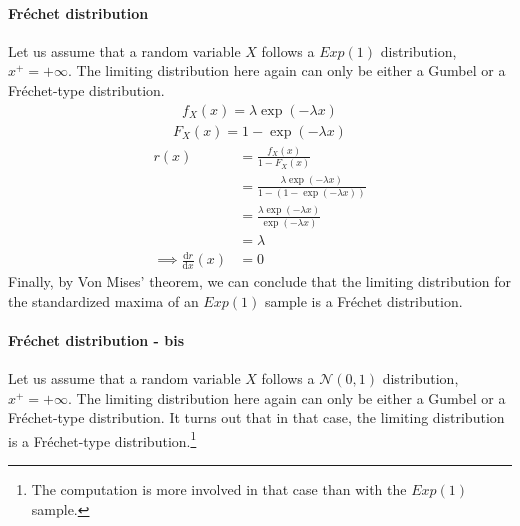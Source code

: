 \paragraph{Fréchet distribution}
Let us assume that a random variable $X$ follows a $Exp(1)$ distribution, $x^+ = + \infty$. The limiting distribution here again can only be either a Gumbel or a Fréchet-type distribution.
\begin{equation}
\begin{alignat*}{2}
f_X(x) = \lambda \exp(- \lambda x)
\end{alignat*}
\end{equation}
\begin{equation}
\begin{alignat*}{2}
F_X(x) =  1 - \exp(- \lambda x)
\end{alignat*}
\end{equation}
\begin{equation}
\begin{alignat*}{2}
r(x) &= \frac{f_X(x)}{1 - F_X(x)} \\
&= \frac{\lambda \exp(- \lambda x)}{1 - (1 - \exp(- \lambda x))} \\
&= \frac{\lambda \exp(- \lambda x)}{\exp(- \lambda x)} \\
&= \lambda \\
\implies \frac{\mathrm{d}r}{\mathrm{d}x}(x) &= 0
\end{alignat*}
\end{equation}
Finally, by Von Mises' theorem, we can conclude that the limiting distribution for the standardized maxima of an $Exp(1)$ sample is a Fréchet distribution.
\paragraph{Fréchet distribution - bis}
Let us assume that a random variable $X$ follows a $\mathcal{N}(0,1)$ distribution, $x^+ = + \infty$. The limiting distribution here again can only be either a Gumbel or a Fréchet-type distribution. It turns out that in that case, the limiting distribution is a Fréchet-type distribution.\footnote{The computation is more involved in that case than with the $Exp(1)$ sample.}
